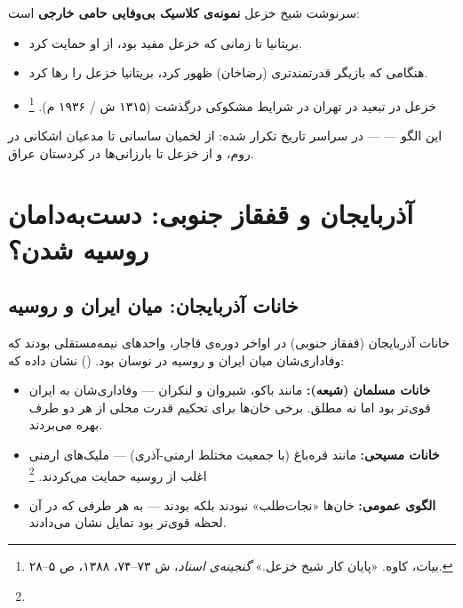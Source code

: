 \begin{tcolorbox}[enemybox, title={درس تاریخی: بی‌وفایی حامی خارجی}]
سرنوشت شیخ خزعل \textbf{نمونه‌ی کلاسیک بی‌وفایی حامی خارجی} است:
\begin{itemize}[nosep, rightmargin=1em]
  \item بریتانیا تا زمانی که خزعل مفید بود، از او حمایت کرد.
  \item هنگامی که بازیگر قدرتمندتری (رضاخان) ظهور کرد، بریتانیا خزعل را رها کرد.
  \item خزعل در تبعید در تهران در شرایط مشکوکی درگذشت (۱۳۱۵ ش / ۱۹۳۶ م).%
  \footnote{بیات، کاوه. «پایان کار شیخ خزعل.» \textit{گنجینه‌ی اسناد}، ش ۷۳--۷۴، ۱۳۸۸، ص ۵--۲۸.}
\end{itemize}

این الگو —  — در سراسر تاریخ تکرار شده: از لخمیان ساسانی تا مدعیان اشکانی در روم، و از خزعل تا بارزانی‌ها در کردستان عراق.
\end{tcolorbox}

\section{آذربایجان و قفقاز جنوبی: دست‌به‌دامان روسیه شدن؟}
\label{sec:ch06-azerbaijan}

\subsection{خانات آذربایجان: میان ایران و روسیه}
\label{subsec:ch06-khanates}

خانات آذربایجان (قفقاز جنوبی) در اواخر دوره‌ی قاجار، واحدهای نیمه‌مستقلی بودند که وفاداری‌شان میان ایران و روسیه در نوسان بود.  () نشان داده که:

\begin{itemize}[nosep, rightmargin=1em]
  \item \textbf{خانات مسلمان (شیعه):} مانند باکو، شیروان و لنکران — وفاداری‌شان به ایران قوی‌تر بود اما نه مطلق. برخی خان‌ها برای تحکیم قدرت محلی از هر دو طرف بهره می‌بردند.
  \item \textbf{خانات مسیحی:} مانند قره‌باغ (با جمعیت مختلط ارمنی-آذری) — ملیک‌های ارمنی اغلب از روسیه حمایت می‌کردند.%
  \footnote{}
  \item \textbf{الگوی عمومی:} خان‌ها «نجات‌طلب» نبودند بلکه  بودند — به هر طرفی که در آن لحظه قوی‌تر بود تمایل نشان می‌دادند.
\end{itemize}


